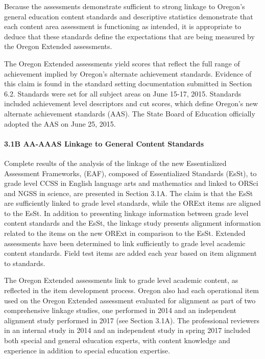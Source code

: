 \documentclass[]{article}
\let\oldparagraph\paragraph
\renewcommand{\paragraph}[1]{\oldparagraph{#1}\mbox{}}
\begin{document}
Because the assessments demonstrate sufficient to strong linkage to
Oregon's general education content standards and descriptive statistics
demonstrate that each content area assessment is functioning as
intended, it is appropriate to deduce that these standards define the
expectations that are being measured by the Oregon Extended assessments.

The Oregon Extended assessments yield scores that reflect the full range
of achievement implied by Oregon's alternate achievement standards.
Evidence of this claim is found in the standard setting documentation
submitted in Section 6.2. Standards were set for all subject areas on
June 15-17, 2015. Standards included achievement level descriptors and
cut scores, which define Oregon's new alternate achievement standards
(AAS). The State Board of Education officially adopted the AAS on June
25, 2015.

\paragraph{3.1B AA-AAAS Linkage to General Content
Standards}\label{b-aa-aaas-linkage-to-general-content-standards}

Complete results of the analysis of the linkage of the new Essentialized
Assessment Frameworks, (EAF), composed of Essentialized Standards
(EsSt), to grade level CCSS in English language arts and mathematics and
linked to ORSci and NGSS in science, are presented in Section 3.1A. The
claim is that the EsSt are sufficiently linked to grade level standards,
while the ORExt items are aligned to the EsSt. In addition to presenting
linkage information between grade level content standards and the EsSt,
the linkage study presents alignment information related to the items on
the new ORExt in comparison to the EsSt. Extended assessments have been
determined to link sufficiently to grade level academic content
standards. Field test items are added each year based on item alignment
to standards.

The Oregon Extended assessments link to grade level academic content, as
reflected in the item development process. Oregon also had each
operational item used on the Oregon Extended assessment evaluated for
alignment as part of two comprehensive linkage studies, one performed in
2014 and an independent alignment study performed in 2017 (see Section
3.1A). The professional reviewers in an internal study in 2014 and an
independent study in spring 2017 included both special and general
education experts, with content knowledge and experience in addition to
special education expertise.
\end{document}
